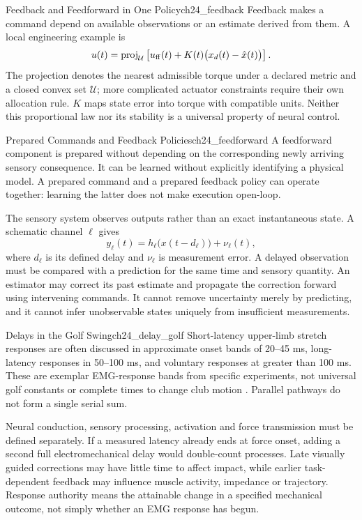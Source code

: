 \begin{definition}{Feedback and Feedforward in One Policy}{ch24_feedback}
Feedback makes a command depend on available observations or an estimate derived from them. A local engineering example is
\[
u(t)=\operatorname{proj}_{\mathcal U}
\left[u_{\rm ff}(t)+K(t)\bigl(x_d(t)-\hat x(t)\bigr)\right].
\]
The projection denotes the nearest admissible torque under a declared metric and a closed convex set $\mathcal U$; more complicated actuator constraints require their own allocation rule. $K$ maps state error into torque with compatible units. Neither this proportional law nor its stability is a universal property of neural control.
\end{definition}
\begin{definition}{Prepared Commands and Feedback Policies}{ch24_feedforward}
A feedforward component is prepared without depending on the corresponding newly arriving sensory consequence. It can be learned without explicitly identifying a physical model. A prepared command and a prepared feedback policy can operate together: learning the latter does not make execution open-loop.
\end{definition}
\label{subsec:ch24_ff_vs_fb}
\label{myth:box:ch24_feedback_fantasy}

The sensory system observes outputs rather than an exact instantaneous state. A schematic channel $\ell$ gives
\[
y_\ell(t)=h_\ell\bigl(x(t-d_\ell)\bigr)+\nu_\ell(t),
\]
where $d_\ell$ is its defined delay and $\nu_\ell$ is measurement error. A delayed observation must be compared with a prediction for the same time and sensory quantity. An estimator may correct its past estimate and propagate the correction forward using intervening commands. It cannot remove uncertainty merely by predicting, and it cannot infer unobservable states uniquely from insufficient measurements.

\begin{example}{Delays in the Golf Swing}{ch24_delay_golf}
Short-latency upper-limb stretch responses are often discussed in approximate onset bands of 20--45 ms, long-latency responses in 50--100 ms, and voluntary responses at greater than 100 ms. These are exemplar EMG-response bands from specific experiments, not universal golf constants or complete times to change club motion \citep{kurtzer2014longlatency,pruszynski2012longlatency}. Parallel pathways do not form a single serial sum.

Neural conduction, sensory processing, activation and force transmission must be defined separately. If a measured latency already ends at force onset, adding a second full electromechanical delay would double-count processes. Late visually guided corrections may have little time to affect impact, while earlier task-dependent feedback may influence muscle activity, impedance or trajectory. Response authority means the attainable change in a specified mechanical outcome, not simply whether an EMG response has begun.
\end{example}

